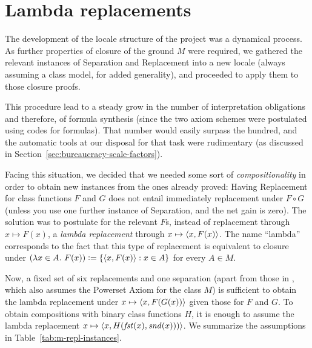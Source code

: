 \section{Lambda replacements}\label{sec:lambda-replacements}

The development of the locale structure of the project was a dynamical
process. As further properties of closure of the ground $M$ were
required, we gathered the relevant instances of Separation and
Replacement into a new locale (always assuming a class model, for
added generality), and proceeded to apply them to those closure proofs.

This procedure lead to a steady grow in the number of interpretation
obligations and therefore, of formula synthesis (since the two axiom
schemes were postulated using codes for formulas). That number would
easily surpass the hundred, and the automatic tools at our disposal
for that task were rudimentary (as discussed in
Section~\ref{sec:bureaucracy-scale-factors}).

Facing this situation, we decided that we needed some sort of
\emph{compositionality} in order to obtain new instances from the ones
already proved: Having Replacement for class functions $F$ and $G$
does not entail immediately replacement under $F\circ G$ (unless you
use one further instance of Separation, and the net gain is zero). The
solution was to postulate for the relevant $F$s, instead of
replacement through $x\mapsto F(x)$, a \emph{lambda replacement}
through $x\mapsto \langle x,F(x)\rangle$. The name “lambda” corresponds to the
fact that this type of replacement is equivalent to closure under
$(\lambda x\in A.\ F(x)) \mathrel{\mathop:}= \{ \langle x,F(x)\rangle : x\in A \}$ for every
$A\in M$.

Now, a fixed set of six replacements and one separation (apart from
those in , which also assumes the Powerset
Axiom for the class $M$) is sufficient to obtain the lambda
replacement under $x\mapsto \langle x,F(G(x))\rangle$ given those for $F$ and
$G$. To obtain compositions with binary class functions $H$, it is
enough to assume the lambda replacement
$x\mapsto \langle x,H(\mathit{fst}(x),\mathit{snd}(x)))\rangle$. We summarize
the assumptions in Table~\ref{tab:m-repl-instances}.

